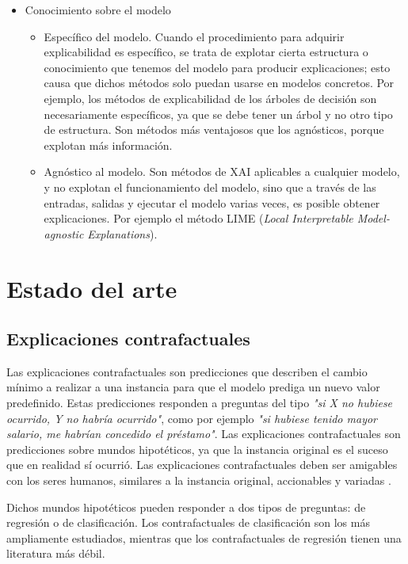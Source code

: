 \documentclass[12pt]{report} %
\begin{document}
\begin{itemize}
\begin{itemize}
          \end{itemize}
    \item Conocimiento sobre el modelo
          \begin{itemize}
              \item Específico del modelo. Cuando el procedimiento para adquirir explicabilidad es específico, se trata de explotar cierta estructura o conocimiento que tenemos del modelo para producir explicaciones; esto causa que dichos métodos solo puedan usarse en modelos concretos. Por ejemplo, los métodos de explicabilidad de los árboles de decisión son necesariamente específicos, ya que se debe tener un árbol y no otro tipo de estructura. Son métodos más ventajosos que los agnósticos, porque explotan más información.
              \item Agnóstico al modelo. Son métodos de XAI aplicables a cualquier modelo, y no explotan el funcionamiento del modelo, sino que a través de las entradas, salidas y ejecutar el modelo varias veces, es posible obtener explicaciones. Por ejemplo el método LIME (\textit{Local Interpretable Model-agnostic Explanations}).
          \end{itemize}
\end{itemize}

\chapter{Estado del arte}
\label{cap:estadodelarte}
\section{Explicaciones contrafactuales}

Las explicaciones contrafactuales son predicciones que describen el cambio mínimo a realizar a una instancia para que el modelo prediga un nuevo valor predefinido. Estas predicciones responden a preguntas del tipo \textit{"si X no hubiese ocurrido, Y no habría ocurrido"}, como por ejemplo \textit{"si hubiese tenido mayor salario, me habrían concedido el préstamo"}. Las explicaciones contrafactuales son predicciones sobre mundos hipotéticos, ya que la instancia original es el suceso que en realidad sí ocurrió. Las explicaciones contrafactuales deben ser amigables con los seres humanos, similares a la instancia original, accionables y variadas \cite{molnar2025}.

Dichos mundos hipotéticos pueden responder a dos tipos de preguntas: de regresión o de clasificación. Los contrafactuales de clasificación son los más ampliamente estudiados, mientras que los contrafactuales de regresión tienen una literatura más débil.
\end{document}
